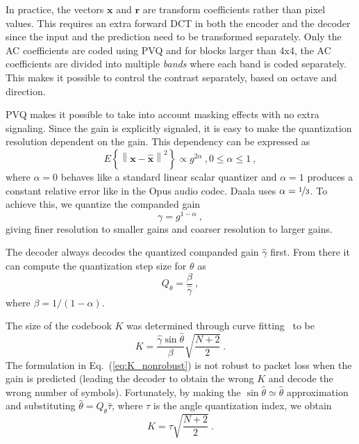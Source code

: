 \documentclass[english,conference,10pt]{IEEEtran}
\begin{document}
In practice, the vectors $\mathbf{x}$ and $\mathbf{r}$ are transform
coefficients rather than pixel values. This requires an extra forward DCT
in both the encoder and the decoder since the input and the prediction need
to be transformed separately. Only the AC coefficients are coded using PVQ
and for blocks larger than 4x4, the AC coefficients are divided into multiple
\textit{bands} where each band is coded separately. This makes it possible
to control the contrast separately, based on octave and direction.

PVQ makes it possible to take into account masking effects with no
extra signaling. Since the gain is explicitly signaled, it is easy to make
the quantization resolution dependent on the gain. This dependency can be
expressed as
\begin{equation}
E\left\lbrace \left\| \mathbf{x} - \hat{\mathbf{x}} \right\|^2 \right\rbrace
\propto g^{2\alpha}\ , 0 \leq \alpha \leq 1\ ,
\end{equation}
where $\alpha=0$ behaves like a standard linear scalar quantizer and
$\alpha=1$ produces a constant relative error like in the Opus audio codec.
Daala uses $\alpha = \nicefrac{1}{3}$. To achieve this, we quantize the
companded gain
\begin{equation}
\gamma = g^{1-\alpha}\ ,
\end{equation}
giving finer resolution to smaller gains and coarser resolution to larger
gains.

The decoder always decodes the quantized companded gain $\hat{\gamma}$
first. From there it can compute the quantization step size for $\theta$ as
\begin{equation}
Q_\theta = \frac{\beta}{\hat{\gamma}}\ ,
\end{equation}
where $\beta = 1/(1-\alpha)$.

The size of the codebook $K$ was determined through curve
fitting~\cite{valin2015spie} to be
\begin{equation}
K = \frac{\hat{\gamma}\sin\hat{\theta}}{\beta}\sqrt{\frac{N+2}{2}}\ .
\label{eq:K_nonrobust}
\end{equation}
The formulation in Eq.~(\ref{eq:K_nonrobust}) is not robust to packet loss when
the gain is predicted (leading the decoder to obtain the wrong $K$ and decode
the wrong number of symbols). Fortunately, by making the $\sin{\hat{\theta}}
\simeq \hat{\theta}$ approximation and substituting $\hat{\theta} = 
Q_\theta\hat{\tau}$, where $\tau$ is the angle quantization index, we obtain
\begin{equation}
K = \tau \sqrt{\frac{N+2}{2}}\ .
\end{equation}
\end{document}
